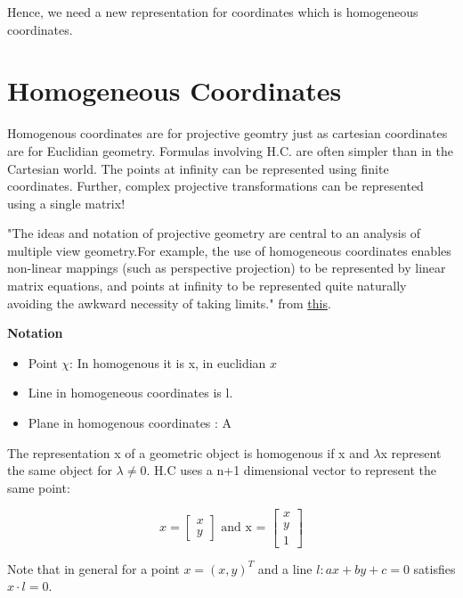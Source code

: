 Hence, we need a new representation for coordinates which is homogeneous coordinates.

\section{Homogeneous Coordinates}

Homogenous coordinates are for projective geomtry just as cartesian coordinates are for Euclidian geometry. Formulas involving H.C. are often simpler than in the Cartesian world. The points at infinity can be represented using finite coordinates. Further, complex projective transformations can be represented using a single matrix! 

"The  ideas and notation of projective geometry are central to an analysis of multiple view geometry.For example, the use of homogeneous coordinates enables non-linear mappings (such as perspective projection) to be represented by linear matrix equations, and points at infinity  to  be  represented  quite  naturally  avoiding  the  awkward  necessity  of  taking limits." from \href{https://github.com/pranjals16/cs676/blob/master/Hartley\%2C\%20Zisserman\%20-\%20Multiple\%20View\%20Geometry\%20in\%20Computer\%20Vision.pdf}{this}.

\textbf{Notation}

\begin{itemize} 
    \item Point $\chi$: In homogenous it is x, in euclidian $x$
    \item Line in homogeneous coordinates is l.
    \item Plane in homogenous coordinates : A
\end{itemize}

The representation x of a geometric object is homogenous if x and $\lambda$x represent the same object for $\lambda \neq 0$. H.C uses a n+1 dimensional vector to represent the same point:

\begin{equation}
    x = \begin{bmatrix}
    x \\
    y
    \end{bmatrix} \text{ and x = } \begin{bmatrix}
    x \\
    y\\
    1
    \end{bmatrix}
\end{equation}

Note that in general for a point $x = (x, y)^T$ and a line $l: ax + by + c = 0$ satisfies $x \cdot l = 0$. 

